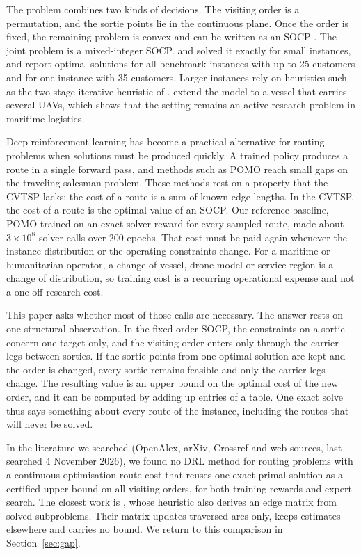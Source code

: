 \documentclass[preprint,12pt,authoryear]{elsarticle}
\begin{document}
The problem combines two kinds of decisions. The visiting order is a permutation, and the sortie points lie in the continuous plane. Once the order is fixed, the remaining problem is convex and can be written as an SOCP \citep{lobo1998}. The joint problem is a mixed-integer SOCP. \citet{gambella2018} and \citet{erdogan2021} solved it exactly for small instances, and \citet{vieira2026} report optimal solutions for all benchmark instances with up to 25 customers and for one instance with 35 customers. Larger instances rely on heuristics such as the two-stage iterative heuristic of \citet{li2025}. \citet{ren2026} extend the model to a vessel that carries several UAVs, which shows that the setting remains an active research problem in maritime logistics.

Deep reinforcement learning has become a practical alternative for routing problems when solutions must be produced quickly. A trained policy produces a route in a single forward pass, and methods such as POMO \citep{kwon2020} reach small gaps on the traveling salesman problem. These methods rest on a property that the CVTSP lacks: the cost of a route is a sum of known edge lengths. In the CVTSP, the cost of a route is the optimal value of an SOCP. Our reference baseline, POMO trained on an exact solver reward for every sampled route, made about $3 \times 10^{8}$ solver calls over 200 epochs. That cost must be paid again whenever the instance distribution or the operating constraints change. For a maritime or humanitarian operator, a change of vessel, drone model or service region is a change of distribution, so training cost is a recurring operational expense and not a one-off research cost.

This paper asks whether most of those calls are necessary. The answer rests on one structural observation. In the fixed-order SOCP, the constraints on a sortie concern one target only, and the visiting order enters only through the carrier legs between sorties. If the sortie points from one optimal solution are kept and the order is changed, every sortie remains feasible and only the carrier legs change. The resulting value is an upper bound on the optimal cost of the new order, and it can be computed by adding up entries of a table. One exact solve thus says something about every route of the instance, including the routes that will never be solved.

In the literature we searched (OpenAlex, arXiv, Crossref and web sources, last searched 4 November 2026), we found no DRL method for routing problems with a continuous-optimisation route cost that reuses one exact primal solution as a certified upper bound on all visiting orders, for both training rewards and expert search. The closest work is \citet{li2025}, whose heuristic also derives an edge matrix from solved subproblems. Their matrix updates traversed arcs only, keeps estimates elsewhere and carries no bound. We return to this comparison in Section~\ref{sec:gap}.
\end{document}
